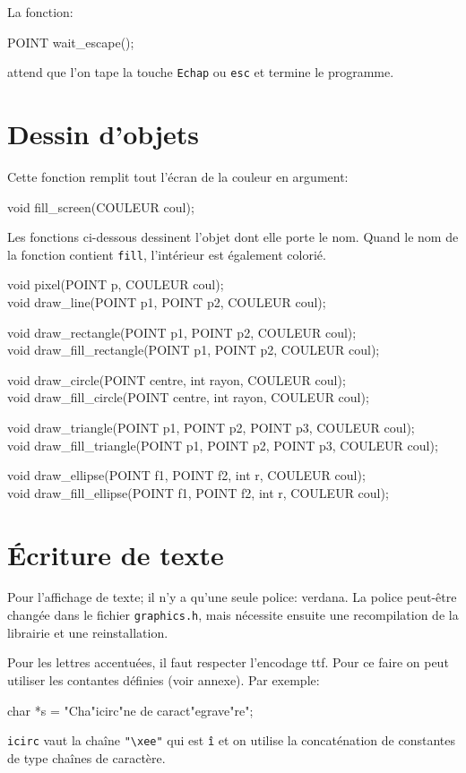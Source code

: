 \documentclass{report}
\newcommand\code[1]{
\begin{mdframed}[linecolor=purple,backgroundcolor=blue!10]
{\tt
#1
}
\end{mdframed}
}
\begin{document}
La fonction:
\code{
POINT wait\_escape();
}
attend que l'on tape la touche \texttt{Echap} ou \texttt{esc} et termine le programme.

\section{Dessin d'objets}
Cette fonction remplit tout l'écran de la couleur en argument:
\code{
void fill\_screen(COULEUR coul);
}

Les fonctions ci-dessous dessinent l'objet dont elle porte le nom.
Quand le nom de la fonction contient \texttt{fill}, l'intérieur est également
colorié.
\code{
void pixel(POINT p, COULEUR coul);\\
void draw\_line(POINT p1, POINT p2, COULEUR coul);

\vspace{3mm}
\noindent
void draw\_rectangle(POINT p1, POINT p2, COULEUR coul); \\
void draw\_fill\_rectangle(POINT p1, POINT p2, COULEUR coul);

\vspace{3mm}
\noindent
void draw\_circle(POINT centre, int rayon, COULEUR coul);\\
void draw\_fill\_circle(POINT centre, int rayon, COULEUR coul);

\vspace{3mm}
\noindent
void draw\_triangle(POINT p1, POINT p2, POINT p3, COULEUR coul);\\
void draw\_fill\_triangle(POINT p1, POINT p2, POINT p3, COULEUR coul);

\vspace{3mm}
\noindent
void draw\_ellipse(POINT f1, POINT f2, int r, COULEUR coul);\\
void draw\_fill\_ellipse(POINT f1, POINT f2, int r, COULEUR coul);
}


\section{Écriture de texte}
Pour l'affichage de texte; il n'y a qu'une seule police: verdana.
La police peut-être changée dans le fichier \texttt{graphics.h},
mais nécessite ensuite une recompilation de la librairie et une reinstallation.

Pour les lettres accentuées, il faut respecter l'encodage ttf.
Pour ce faire on peut utiliser les contantes définies (voir annexe).
Par exemple:
\code{
char *s = "Cha"icirc"ne de caract"egrave"re";
}
\texttt{icirc} vaut la chaîne \texttt{"\textbackslash xee"} qui est \texttt{î} et on utilise la concaténation
de constantes de type chaînes de caractère.
\end{document}

